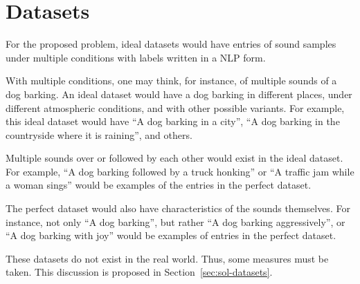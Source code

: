 \section{Datasets} \label{sec:prob-datasets}

For the proposed problem, ideal datasets would have entries of sound samples under multiple conditions with labels written in a \ac{NLP} form.

With multiple conditions, one may think, for instance, of multiple sounds of a dog barking. An ideal dataset would have a dog barking in different places, under different atmospheric conditions, and with other possible variants. For example, this ideal dataset would have ``A dog barking in a city'', ``A dog barking in the countryside where it is raining'', and others.

Multiple sounds over or followed by each other would exist in the ideal dataset. For example, ``A dog barking followed by a truck honking'' or ``A traffic jam while a woman sings'' would be examples of the entries in the perfect dataset.

The perfect dataset would also have characteristics of the sounds themselves. For instance, not only ``A dog barking'', but rather ``A dog barking aggressively'', or ``A dog barking with joy'' would be examples of entries in the perfect dataset.

These datasets do not exist in the real world. Thus, some measures must be taken. This discussion is proposed in Section~\ref{sec:sol-datasets}.